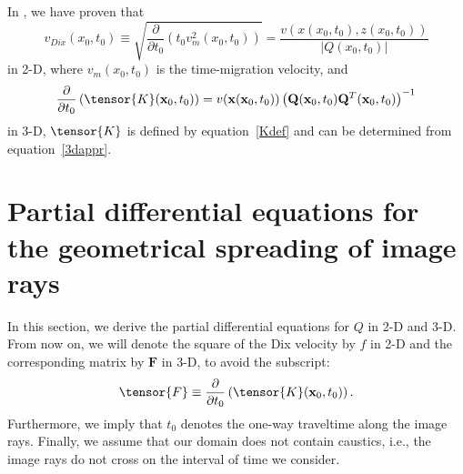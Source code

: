In \cite[]{cfs}, we have proven that 
\begin{equation}
\label{2Dvdix-v}
v_{Dix}(x_0,t_0)\equiv\sqrt{\frac{\partial}{\partial t_0}
\left(t_0v_m^2(x_0,t_0)\right)}=
\frac{v(x(x_0,t_0),z(x_0,t_0))}{|Q(x_0,t_0)|}
\end{equation}
in 2-D, where $v_m(x_0,t_0)$ is the time-migration velocity, and
\begin{equation}
\label{3Dvdix-v}
\frac{\partial}{\partial t_0}
\left(\tensor{K}(\mathbf{x}_0,t_0)\right)=
v(\mathbf{x}(\mathbf{x}_0,t_0))\left(\mathbf{Q}(\mathbf{x}_0,t_0)
\mathbf{Q}^T(\mathbf{x}_0,t_0)\right)^{-1}
\end{equation}
in 3-D, $\tensor{K}$ is defined by equation~\ref{Kdef}
and can be determined from equation~\ref{3dappr}.


\section{Partial differential equations for the geometrical spreading of image rays}
In this section, we derive the partial differential equations for $Q$
in 2-D and 3-D.  From now on, we will denote the square of the Dix
velocity by $f$ in 2-D and the corresponding matrix by
$\mathbf{F}$ in 3-D, to avoid the subscript:
\begin{equation}
\tensor{F}\equiv \label{Fdef}\frac{\partial}{\partial t_0}
\left(\tensor{K}(\mathbf{x}_0,t_0)\right).
\end{equation}
Furthermore, we imply that $t_0$ denotes the one-way
traveltime  along the image rays.
Finally, we assume that our domain does 
not contain caustics, i.e., the image rays do not cross
on the interval of time we consider.

